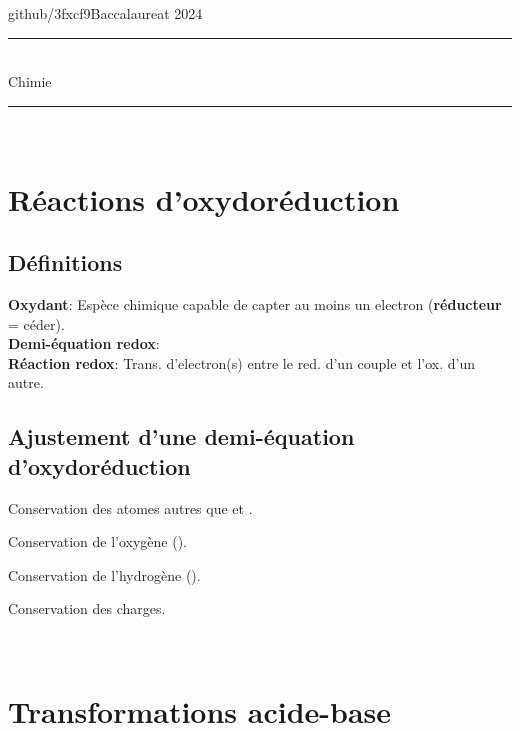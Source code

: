 \documentclass[a5paper,10pt]{article}
\newcommand{\assignmentauthor}{github/3fxcf9}
\newcommand{\assignmentdate}{Baccalaureat 2024}
\newcommand{\assignmenttitle}{Chimie}
\begin{document}
\renewcommand{\headsep}{10pt}
\thispagestyle{empty}
\vspace*{-1cm}
\noindent\assignmentauthor \hfill \assignmentdate
\vspace{-6pt}
\begin{center}
    \rule[2ex]{\textwidth}{1pt}\\
    \vspace{-4pt}
    {\Large{\assignmenttitle}}
    \vspace{-4pt}
\end{center}
\rule[2ex]{\textwidth}{1pt}\\
\title{}
\author{}
\date{}
\vspace{-0.5cm}

\section{Réactions d'oxydoréduction}
\subsection{Définitions}
\textbf{Oxydant}: Espèce chimique capable de capter au moins un electron (\textbf{réducteur} = céder).\\
\textbf{Demi-équation redox}: \\
\textbf{Réaction redox}: Trans. d'electron(s) entre le red. d'un couple et l'ox. d'un autre.

\subsection{Ajustement d'une demi-équation d'oxydoréduction}
\begin{adjustwidth}{10pt}{0pt}
    \begin{enumerate*}[noitemsep, label=\textbf{\arabic*}.]
        \item Conservation des atomes autres que  et .\phantom{text}
        \item Conservation de l'oxygène ().\\
        \item Conservation de l'hydrogène ().\phantom{textnrsuietrn}
        \item Conservation des charges.
    \end{enumerate*}\\
\end{adjustwidth}

\section{Transformations acide-base}
\end{document}
